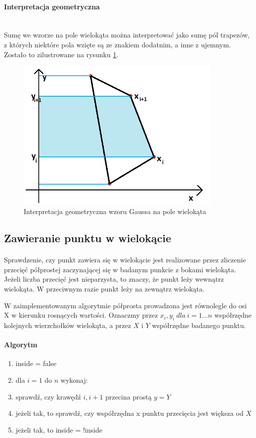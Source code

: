 \documentclass{article}
\newcommand{\tab}[1]{\hspace{.05\textwidth}\rlap{#1}}
\begin{document}
\paragraph{Interpretacja geometryczna} \mbox{}\\
Sumę we wzorze na pole wielokąta można interpretować jako sumę pól trapezów, z których niektóre pola wzięte są ze znakiem dodatnim, a inne z ujemnym. Zostało to zilustrowane na rysunku \ref{fig:trapez}.

\begin{figure}[H]
    \centering
    \includegraphics[width=10cm]{trapez.png}
    \caption{Interpretacja geometryczna wzoru Gaussa na pole wielokąta}
    \label{fig:trapez}
\end{figure}

\subsection{Zawieranie punktu w wielokącie}

\paragraph{}
Sprawdzenie, czy punkt zawiera się w wielokącie jest realizowane przez zliczenie przecięć półprostej zaczynającej się w badanym punkcie z bokami wielokąta. Jeżeli liczba przecięć jest nieparzysta, to znaczy, że punkt leży wewnątrz wielokąta. W przeciwnym razie punkt leży na zewnątrz wielokąta.


W zaimplementowanym algorytmie półprosta prowadzona jest równolegle do osi X w kierunku rosnących wartości. Oznaczmy przez \(x_i, y_i\ dla\ i=1...n\) współrzędne kolejnych wierzchołków wielokąta, a przez \(X\) i \(Y\) współrzędne badanego punktu.

\paragraph{Algorytm}
\begin{enumerate}
\item inside = false
\item dla \(i=1\) do \(n\) wykonaj: 
\item \tab \tab sprawdź, czy krawędź \(i, i+1\) przecina prostą \(y=Y\)
\item \tab \tab jeżeli tak, to sprawdź, czy współrzędna x punktu przecięcia jest większa od \(X\)
\item \tab \tab jeżeli tak, to inside = !inside
\end{enumerate}
\end{document}
